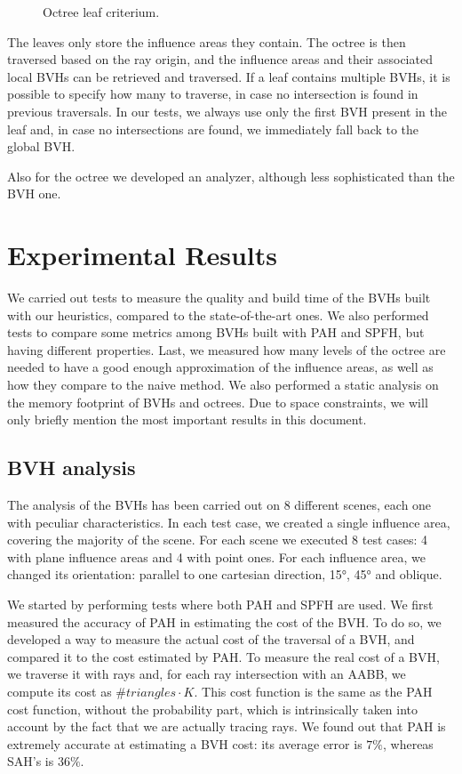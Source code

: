 \documentclass[11pt,a4paper,twocolumn]{article}
\begin{document}
\begin{figure}[H]
{    }
    \caption{Octree leaf criterium.}
    \label{fig:leaves}
\end{figure}

The leaves only store the influence areas they contain. The octree is then traversed based on the ray origin, and the influence areas and their associated local BVHs can be retrieved and traversed. If a leaf contains multiple BVHs, it is possible to specify how many to traverse, in case no intersection is found in previous traversals. In our tests, we always use only the first BVH present in the leaf and, in case no intersections are found, we immediately fall back to the global BVH.

Also for the octree we developed an analyzer, although less sophisticated than the BVH one.

\section{Experimental Results}
We carried out tests to measure the quality and build time of the BVHs built with our heuristics, compared to the state-of-the-art ones. We also performed tests to compare some metrics among BVHs built with PAH and SPFH, but having different properties. Last, we measured how many levels of the octree are needed to have a good enough approximation of the influence areas, as well as how they compare to the naive method. We also performed a static analysis on the memory footprint of BVHs and octrees. Due to space constraints, we will only briefly mention the most important results in this document.

\subsection{BVH analysis}
The analysis of the BVHs has been carried out on 8 different scenes, each one with peculiar characteristics. In each test case, we created a single influence area, covering the majority of the scene. For each scene we executed 8 test cases: 4 with plane influence areas and 4 with point ones. For each influence area, we changed its orientation: parallel to one cartesian direction, 15°, 45° and oblique.

We started by performing tests where both PAH and SPFH are used. We first measured the accuracy of PAH in estimating the cost of the BVH. To do so, we developed a way to measure the actual cost of the traversal of a BVH, and compared it to the cost estimated by PAH. To measure the real cost of a BVH, we traverse it with rays and, for each ray intersection with an AABB, we compute its cost as $\#triangles \cdot K$. This cost function is the same as the PAH cost function, without the probability part, which is intrinsically taken into account by the fact that we are actually tracing rays. We found out that PAH is extremely accurate at estimating a BVH cost: its average error is $7\%$, whereas SAH's is $36\%$.
\end{document}
